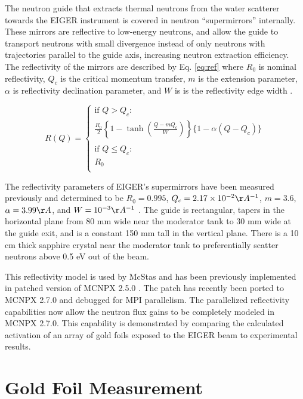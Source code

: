 \documentclass[a4paper,
              ]{jacow}
\begin{document}
The neutron guide that extracts thermal neutrons from the water scatterer towards the EIGER instrument is covered in neutron ``supermirrors'' internally.  These mirrors are reflective to low-energy neutrons, and allow the guide to transport neutrons with small divergence instead of only neutrons with trajectories parallel to the guide axis, increasing neutron extraction efficiency.  The reflectivity of the mirrors are described by Eq. \ref{eq:ref} where $R_0$ is nominal reflectivity, $Q_c$ is the critical momentum transfer, $m$ is the extension parameter, $\alpha$ is reflectivity declination parameter, and $W$ is is the reflectivity edge width \cite{mcnpx-ref}.

\begin{equation}\label{eq:ref}
R(Q) = 
\begin{cases}
    \mbox{if } Q > Q_c : \\
    \frac{R_0}{2}\left\{  1 - \tanh\left(  \frac{Q - m Q_c}{W}\right) \right\}\{1-\alpha(Q-Q_c)\} \\
    \\
    \mbox{if } Q \leq Q_c :\\
    R_0 \\
\end{cases}
\end{equation}

The reflectivity parameters of EIGER's supermirrors have been measured previously and determined to be $R_0=0.995$, $Q_c=2.17\times10^{-2}\AA^{-1}$, $m=3.6$, $\alpha=3.99 \AA$, and $W=10^{-3} \AA^{-1}$ \cite{eiger-uwe}.  The guide is rectangular, tapers in the horizontal plane from 80 mm wide near the moderator tank to 30 mm wide at the guide exit, and is a constant 150 mm tall in the vertical plane.  There is a 10 cm thick sapphire crystal near the moderator tank to preferentially scatter neutrons above 0.5 eV out of the beam.

This reflectivity model is used by McStas and has been previously implemented in patched version of MCNPX 2.5.0 \cite{mcnpx-ref}.  The patch has recently been ported to MCNPX 2.7.0 and debugged for MPI parallelism.  The parallelized reflectivity capabilities now allow the neutron flux gains to be completely modeled in MCNPX 2.7.0.  This capability is demonstrated by comparing the calculated activation of an array of gold foils exposed to the EIGER beam to experimental results.

\section{Gold Foil Measurement}
\end{document}
